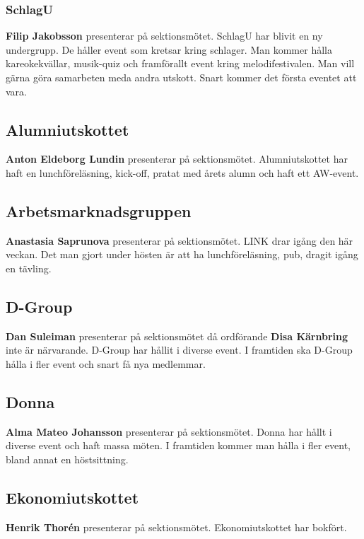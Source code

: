 \documentclass[../protokoll_hostmote_2021.tex]{subfiles}
\begin{document}
\subsubsection{SchlagU}
\textbf{Filip Jakobsson} presenterar på sektionsmötet. SchlagU har blivit en ny undergrupp. De håller event som kretsar kring schlager. Man kommer hålla kareokekvällar, musik-quiz och framförallt event kring melodifestivalen. Man vill gärna göra samarbeten meda andra utskott. Snart kommer det första eventet att vara.


\subsection{Alumniutskottet}
\textbf{Anton Eldeborg Lundin} presenterar på sektionsmötet. Alumniutskottet har haft en lunchföreläsning, kick-off, pratat med årets alumn och haft ett AW-event.



\subsection{Arbetsmarknadsgruppen}
\textbf{Anastasia Saprunova} presenterar på sektionsmötet. LINK drar igång den här veckan. Det man gjort under hösten är att ha lunchföreläsning, pub, dragit igång en tävling.



\subsection{D-Group}
\textbf{Dan Suleiman }  presenterar på sektionsmötet då ordförande \textbf{Disa Kärnbring} inte är närvarande. D-Group har hållit i diverse event. I framtiden ska D-Group hålla i fler event och snart få nya medlemmar.



\subsection{Donna}
\textbf{Alma Mateo Johansson} presenterar på sektionsmötet. Donna har hållt i diverse event och haft massa möten. I framtiden kommer man hålla i fler event, bland annat en höstsittning.


\subsection{Ekonomiutskottet}
\textbf{Henrik Thorén } presenterar på sektionsmötet. Ekonomiutskottet har bokfört.
\end{document}
